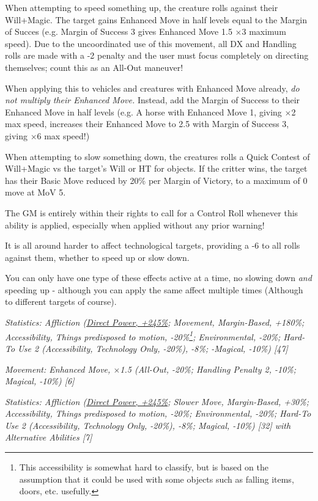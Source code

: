\begin{multicols*}{3}
	When attempting to speed something up, the creature rolls against their Will+Magic. The target gains Enhanced Move in half levels equal to the Margin of Succes (e.g. Margin of Success 3 gives Enhanced Move 1.5 \(\times\)3 maximum speed). Due to the uncoordinated use of this movement, all DX and Handling rolls are made with a -2 penalty and the user must focus completely on directing themselves; count this as an All-Out maneuver!
	
	When applying this to vehicles and creatures with Enhanced Move already, \textit{do not multiply their Enhanced Move.} Instead, add the Margin of Success to their Enhanced Move in half levels (e.g. A horse with Enhanced Move 1, giving \(\times\)2 max speed, increases their Enhanced Move to 2.5 with Margin of Success 3, giving \(\times\)6 max speed!)
	
	When attempting to slow something down, the creatures rolls a Quick Contest of Will+Magic vs the target's Will or HT for objects. If the critter wins, the target has their Basic Move reduced by 20\% per Margin of Victory, to a maximum of 0 move at MoV 5.
	
	The GM is entirely within their rights to call for a Control Roll whenever this ability is applied, especially when applied without any prior warning!
	
	It is all around harder to affect technological targets, providing a -6 to all rolls against them, whether to speed up or slow down.
	
	You can only have one type of these effects active at a time, no slowing down \textit{and} speeding up - although you can apply the same affect multiple times (Although to different targets of course).
	
	\textcolor{OliveGreen}{\textit{Statistics: Affliction (\hyperref[cp_ct]{Direct Power, +245\%}; Movement, Margin-Based, +180\%; Accessibility, Things predisposed to motion, -20\%\footnote{This accessibility is somewhat hard to classify, but is based on the assumption that it could be used with some objects such as falling items, doors, etc. usefully.}; Environmental, -20\%; Hard-To Use 2 (Accessibility, Technology Only, -20\%), -8\%; -Magical, -10\%) [47]}}
	
	\textcolor{OliveGreen}{\textit{Movement: Enhanced Move, \(\times\)1.5 (All-Out, -20\%; Handling Penalty 2, -10\%; Magical, -10\%) [6]}}
	
	\textcolor{OliveGreen}{\textit{Statistics: Affliction (\hyperref[cp_ct]{Direct Power, +245\%}; Slower Move, Margin-Based, +30\%; Accessibility, Things predisposed to motion, -20\%; Environmental, -20\%; Hard-To Use 2 (Accessibility, Technology Only, -20\%), -8\%; Magical, -10\%) [32] with Alternative Abilities [7]}}
	

\end{multicols*}
